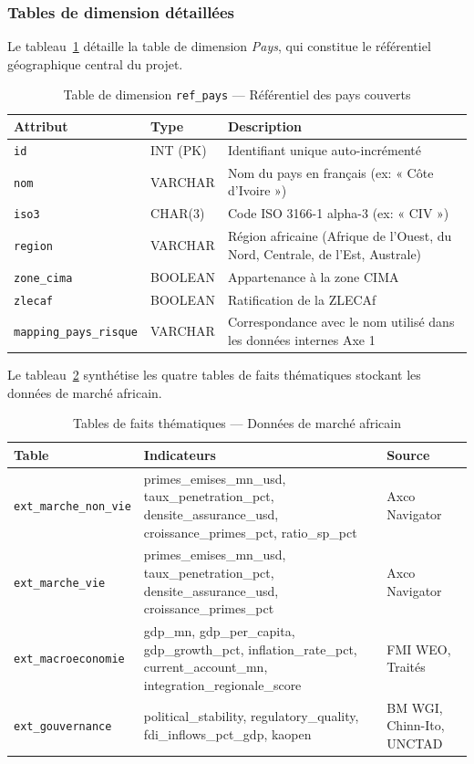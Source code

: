 \documentclass[../main.tex]{subfiles}
\begin{document}
\subsubsection{Tables de dimension détaillées}

Le tableau~\ref{tab:dim_pays} détaille la table de dimension \textit{Pays}, qui constitue le référentiel géographique central du projet.

\begin{table}[H]
\centering
\caption{Table de dimension \texttt{ref\_pays} --- Référentiel des pays couverts}
\label{tab:dim_pays}
\small
\begin{tabularx}{\textwidth}{@{}p{3.5cm}p{2cm}X@{}}
\toprule
\textbf{Attribut} & \textbf{Type} & \textbf{Description} \\
\midrule
\texttt{id}        & INT (PK) & Identifiant unique auto-incrémenté \\
\texttt{nom}       & VARCHAR  & Nom du pays en français (ex: « Côte d'Ivoire ») \\
\texttt{iso3}      & CHAR(3)  & Code ISO 3166-1 alpha-3 (ex: « CIV ») \\
\texttt{region}    & VARCHAR  & Région africaine (Afrique de l'Ouest, du Nord, Centrale, de l'Est, Australe) \\
\texttt{zone\_cima}& BOOLEAN  & Appartenance à la zone CIMA \\
\texttt{zlecaf}    & BOOLEAN  & Ratification de la ZLECAf \\
\texttt{mapping\_pays\_risque} & VARCHAR & Correspondance avec le nom utilisé dans les données internes Axe 1 \\
\bottomrule
\end{tabularx}
\end{table}

Le tableau~\ref{tab:tables_faits} synthétise les quatre tables de faits thématiques stockant les données de marché africain.

\begin{table}[H]
\centering
\caption{Tables de faits thématiques --- Données de marché africain}
\label{tab:tables_faits}
\small
\begin{tabularx}{\textwidth}{@{}p{3.5cm}p{5cm}X@{}}
\toprule
\textbf{Table} & \textbf{Indicateurs} & \textbf{Source} \\
\midrule
\texttt{ext\_marche\_non\_vie} & primes\_emises\_mn\_usd, taux\_penetration\_pct, densite\_assurance\_usd, croissance\_primes\_pct, ratio\_sp\_pct & Axco Navigator \\
\midrule
\texttt{ext\_marche\_vie} & primes\_emises\_mn\_usd, taux\_penetration\_pct, densite\_assurance\_usd, croissance\_primes\_pct & Axco Navigator \\
\midrule
\texttt{ext\_macroeconomie} & gdp\_mn, gdp\_per\_capita, gdp\_growth\_pct, inflation\_rate\_pct, current\_account\_mn, integration\_regionale\_score & FMI WEO, Traités \\
\midrule
\texttt{ext\_gouvernance} & political\_stability, regulatory\_quality, fdi\_inflows\_pct\_gdp, kaopen & BM WGI, Chinn-Ito, UNCTAD \\
\bottomrule
\end{tabularx}
\end{table}
\end{document}
